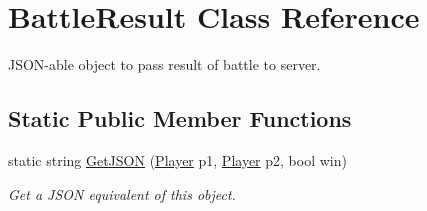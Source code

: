 \hypertarget{class_battle_result}{}\section{Battle\+Result Class Reference}
\label{class_battle_result}


J\+S\+O\+N-\/able object to pass result of battle to server.  


\subsection*{Static Public Member Functions}
\begin{DoxyCompactItemize}
\item 
static string \mbox{\hyperlink{class_battle_result_a269702cb7e87a7029e0ff374eefd5547}{Get\+J\+S\+ON}} (\mbox{\hyperlink{class_player}{Player}} p1, \mbox{\hyperlink{class_player}{Player}} p2, bool win)
\begin{DoxyCompactList}\small\item\em Get a J\+S\+ON equivalent of this object. \end{DoxyCompactList}\end{DoxyCompactItemize}
